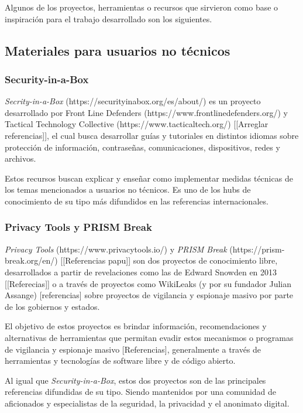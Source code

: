 \documentclass[12pt]{caltech_thesis}
\begin{document}
Algunos de los proyectos, herramientas o recursos que sirvieron como base o inspiración para el trabajo desarrollado son los siguientes.

\subsection{Materiales para usuarios no técnicos}

\subsubsection{Security-in-a-Box}

\textit{Secrity-in-a-Box} (https://securityinabox.org/es/about/) es un proyecto desarrollado por Front Line Defenders (https://www.frontlinedefenders.org/) y Tactical Technology Collective (https://www.tacticaltech.org/) [[Arreglar referencias]], el cual busca desarrollar guías y tutoriales en distintos idiomas sobre protección de información, contraseñas, comunicaciones, dispositivos, redes y archivos.

Estos recursos buscan explicar y enseñar como implementar medidas técnicas de los temas mencionados a usuarios no técnicos. Es uno de los hubs de conocimiento de su tipo más difundidos en las referencias internacionales.

\subsubsection{Privacy Tools y PRISM Break}

\textit{Privacy Tools} (https://www.privacytools.io/) y \textit{PRISM Break} (https://prism-break.org/en/) [[Referencias papu]] son dos proyectos de conocimiento libre, desarrollados a partir de revelaciones como las de Edward Snowden en 2013 [[Referecias]] o a través de proyectos como WikiLeaks (y por su fundador Julian Assange) [referencias] sobre proyectos de vigilancia y espionaje masivo por parte de los gobiernos y estados.

El objetivo de estos proyectos es brindar información, recomendaciones y alternativas de herramientas que permitan evadir estos mecanismos o programas de vigilancia y espionaje masivo [Referencias], generalmente a través de herramientas y tecnologías de software libre y de código abierto.

Al igual que \textit{Security-in-a-Box}, estos dos proyectos son de las principales referencias difundidas de su tipo. Siendo mantenidos por una comunidad de aficionados y especialistas de la seguridad, la privacidad y el anonimato digital.
\end{document}
